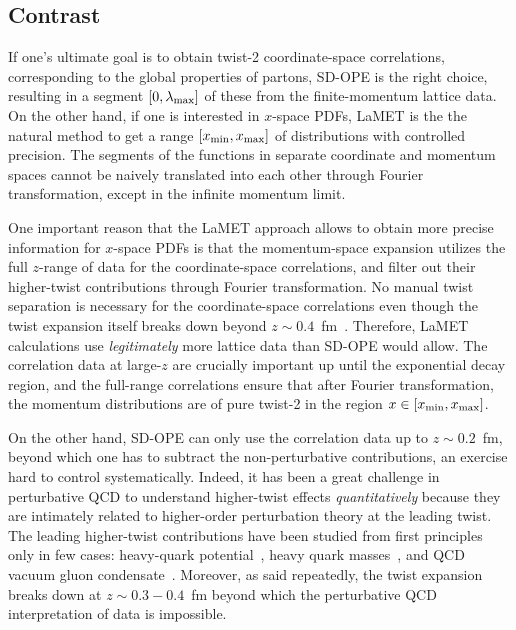 \documentclass[prd,aps,twocolumn,preprintnumbers,showpacs,nofootinbib,superscriptaddress,notitlepage]{revtex4-2}
\begin{document}
\subsection{Contrast}

If one's ultimate goal is to obtain twist-2 coordinate-space correlations, corresponding to the global properties of partons, SD-OPE is the right choice, resulting in a segment $[0,\lambda_{\rm max}]$ of these from the finite-momentum lattice data. On the other hand, if one is interested in $x$-space PDFs, LaMET is the the natural method to get a range $[x_{\rm min}, x_{\rm max}]$ of distributions with  controlled precision.
The segments of the functions in separate coordinate and momentum spaces cannot be naively translated into each other through Fourier transformation, except in the infinite momentum limit. 

One important reason that the LaMET approach
allows to obtain more precise information for $x$-space PDFs is that the momentum-space expansion utilizes the full $z$-range of 
data for the coordinate-space correlations, and filter out their higher-twist contributions through Fourier transformation. No manual twist separation is necessary for the coordinate-space correlations even though the twist expansion itself breaks down beyond $z\sim 0.4$~fm~\cite{Ji:2020brr}.  Therefore, LaMET calculations use {\it legitimately} more lattice data than SD-OPE would allow. The correlation data at large-$z$ are crucially important up until the exponential decay region, and the full-range correlations ensure that after Fourier transformation, the momentum distributions are of pure twist-2 in the region $x\in [x_{\rm min}, x_{\rm max}]$. 

On the other hand, SD-OPE can only use the correlation data up to $z\sim 0.2$~fm, beyond which one has to subtract the non-perturbative contributions, an exercise hard to control systematically. Indeed, it has been a great challenge in perturbative QCD to understand higher-twist effects {\it quantitatively} because they are intimately related to higher-order perturbation theory at the leading twist. The leading higher-twist contributions have been studied from first principles only in few cases: heavy-quark potential~\cite{Pineda:2002se,Ayala:2020odx}, heavy quark masses~\cite{Ayala:2019hkn}, and QCD vacuum gluon condensate~\cite{Ayala:2020pxq}. Moreover, as said repeatedly, the twist expansion breaks down at $z\sim 0.3-0.4$~fm beyond which the perturbative QCD interpretation of data is impossible. 
\end{document}
